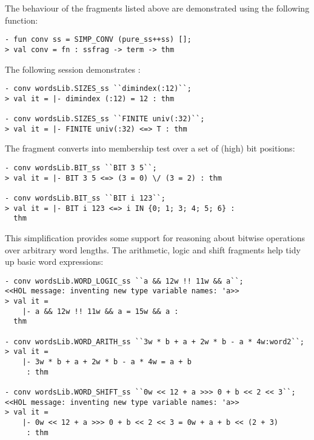 The behaviour of the fragments listed above are demonstrated using the following function:
\begin{session}
\begin{verbatim}
- fun conv ss = SIMP_CONV (pure_ss++ss) [];
> val conv = fn : ssfrag -> term -> thm
\end{verbatim}
\end{session}
The following session demonstrates :
\begin{session}
\begin{verbatim}
- conv wordsLib.SIZES_ss ``dimindex(:12)``;
> val it = |- dimindex (:12) = 12 : thm

- conv wordsLib.SIZES_ss ``FINITE univ(:32)``;
> val it = |- FINITE univ(:32) <=> T : thm
\end{verbatim}
\end{session}
The fragment  converts  into membership test over a set of (high) bit positions:
\begin{session}
\begin{verbatim}
- conv wordsLib.BIT_ss ``BIT 3 5``;
> val it = |- BIT 3 5 <=> (3 = 0) \/ (3 = 2) : thm

- conv wordsLib.BIT_ss ``BIT i 123``;
> val it = |- BIT i 123 <=> i IN {0; 1; 3; 4; 5; 6} :
  thm
\end{verbatim}
\end{session}
This simplification provides some support for reasoning about bitwise operations over arbitrary word lengths.  The arithmetic, logic and shift fragments help tidy up basic word expressions:
\begin{session}
\begin{verbatim}
- conv wordsLib.WORD_LOGIC_ss ``a && 12w !! 11w && a``;
<<HOL message: inventing new type variable names: 'a>>
> val it =
    |- a && 12w !! 11w && a = 15w && a :
  thm

- conv wordsLib.WORD_ARITH_ss ``3w * b + a + 2w * b - a * 4w:word2``;
> val it =
    |- 3w * b + a + 2w * b - a * 4w = a + b
     : thm

- conv wordsLib.WORD_SHIFT_ss ``0w << 12 + a >>> 0 + b << 2 << 3``;
<<HOL message: inventing new type variable names: 'a>>
> val it =
    |- 0w << 12 + a >>> 0 + b << 2 << 3 = 0w + a + b << (2 + 3)
     : thm
\end{verbatim}
\end{session}

